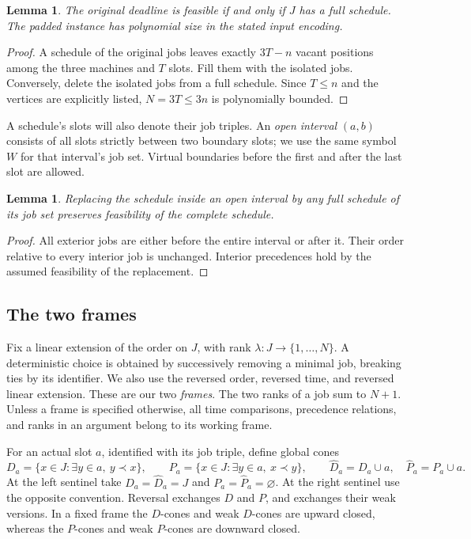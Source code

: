\documentclass[11pt]{article}
\numberwithin{equation}{section}
\newtheorem{lemma}[theorem]{Lemma}
\theoremstyle{definition}
\theoremstyle{remark}
\newcommand{\rk}{\lambda}
\newcommand{\wP}[1]{\widehat P_{#1}}
\newcommand{\wD}[1]{\widehat D_{#1}}
\begin{document}
\begin{lemma}\label{lem:padding}
The original deadline is feasible if and only if \(J\) has a full schedule.
The padded instance has polynomial size in the stated input encoding.
\end{lemma}
\begin{proof}
A schedule of the original jobs leaves exactly \(3T-n\) vacant positions
among the three machines and \(T\) slots. Fill them with the isolated jobs.
Conversely, delete the isolated jobs from a full schedule.
Since \(T\le n\) and the vertices are explicitly listed, \(N=3T\le3n\)
is polynomially bounded.
\end{proof}

A schedule's slots will also denote their job triples. An \emph{open
interval} \((a,b)\) consists of all slots strictly between two boundary
slots; we use the same symbol \(W\) for that interval's job set.
Virtual boundaries before the first and after the last slot are allowed.

\begin{lemma}\label{lem:reorder}
Replacing the schedule inside an open interval by any full schedule of
its job set preserves feasibility of the complete schedule.
\end{lemma}
\begin{proof}
All exterior jobs are either before the entire interval or after it.
Their order relative to every interior job is unchanged. Interior
precedences hold by the assumed feasibility of the replacement.
\end{proof}

\subsection{The two frames}

Fix a linear extension of the order on \(J\), with rank
\(\rk:J\to\{1,\ldots,N\}\). A deterministic choice is obtained by
successively removing a minimal job, breaking ties by its identifier.
We also use the reversed order, reversed time, and reversed linear
extension. These are our two \emph{frames}. The two ranks of a job sum
to \(N+1\). Unless a frame is specified otherwise, all time comparisons,
precedence relations, and ranks in an argument belong to its working frame.

For an actual slot \(a\), identified with its job triple, define global cones
\[
 D_a=\{x\in J:\exists y\in a,\ y\prec x\},
 \qquad
 P_a=\{x\in J:\exists y\in a,\ x\prec y\},
 \qquad
 \wD a=D_a\cup a,\quad \wP a=P_a\cup a .
\]
At the left sentinel take \(D_a=\wD a=J\) and
\(P_a=\wP a=\varnothing\). At the right sentinel use the opposite
convention. Reversal exchanges \(D\) and \(P\), and exchanges their
weak versions. In a fixed frame the \(D\)-cones and weak \(D\)-cones are
upward closed, whereas the \(P\)-cones and weak \(P\)-cones are downward
closed.
\end{document}
